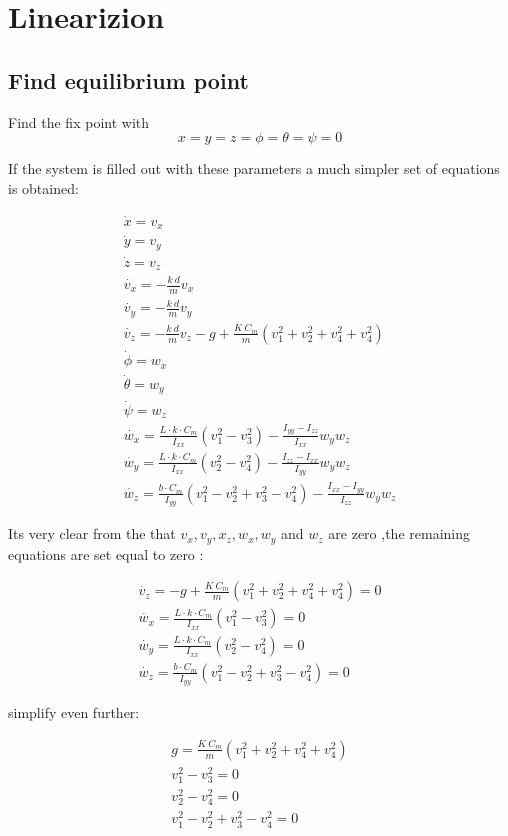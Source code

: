 \section{Linearizion}

\subsection{Find equilibrium point}

Find the fix point with $$x=y=z=\phi=\theta=\psi=0$$

If the system is filled out with these parameters a much simpler set of equations is obtained:

\begin{eqnarray}
\dot{x}=v_x \\
\dot{y}=v_y \\
\dot{z}=v_z \\
\dot{v_x}=-\frac{k \ d}{m}v_x \\
\dot{v_y}=-\frac{k \ d}{m}v_y \\
\dot{v_z}=-\frac{k \ d}{m}v_z -g + \frac{K \ C_m}{m}(v_1^2+v_2^2+v_4^2+v_4^2)\\
\dot{\phi}=w_x \\
\dot{\theta}=w_y \\
\dot{\psi}=w_z \\
\dot{w_x}=\frac{L \cdot k \cdot C_m}{I_{xx}}(v_1^2 - v_3^2) - \frac{I_{yy}-I_{zz}}{I_{xx}} w_y  w_z \\
\dot{w_y}=\frac{L \cdot k \cdot C_m}{I_{xx}}(v_2^2 - v_4^2) - \frac{I_{zz}-I_{xx}}{I_{yy}} w_y  w_z\\
\dot{w_z}=\frac{b \cdot C_m}{I_{yy}}(v_1^2-v_2^2+v_3^2-v_4^2) - \frac{I_{xx}-I_{yy}}{I_{zz}}w_y  w_z
\end{eqnarray}

Its very clear from the that $v_x,v_y,x_z,w_x,w_y$ and $w_z$ are zero ,the remaining equations are set equal to zero :

\begin{eqnarray}
\dot{v_z}= -g + \frac{K \ C_m}{m}(v_1^2+v_2^2+v_4^2+v_4^2) =0\\
\dot{w_x}=\frac{L \cdot k \cdot C_m}{I_{xx}}(v_1^2 - v_3^2) =0 \\
\dot{w_y}=\frac{L \cdot k \cdot C_m}{I_{xx}}(v_2^2 - v_4^2) =0\\
\dot{w_z}=\frac{b \cdot C_m}{I_{yy}}(v_1^2-v_2^2+v_3^2-v_4^2) =0
\end{eqnarray}

simplify even further:

\begin{eqnarray}
g =  \frac{K \ C_m}{m}(v_1^2+v_2^2+v_4^2+v_4^2)\\
v_1^2 - v_3^2 =0 \\
v_2^2 - v_4^2 =0\\
v_1^2-v_2^2+v_3^2-v_4^2 =0
\end{eqnarray}

